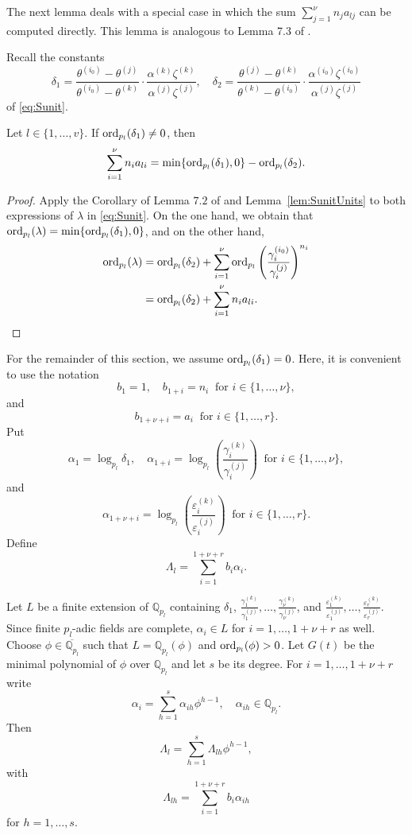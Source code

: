 The next lemma deals with a special case in which the sum $\sum_{j = 1}^{\nu} n_ja_{lj}$ can be computed directly. This lemma is analogous to Lemma 7.3 of \cite{TW3}.

Recall the constants
\[\delta_1 = \frac{\theta^{(i_0)} - \theta^{(j)}}{\theta^{(i_0)} - \theta^{(k)}}\cdot\frac{\alpha^{(k)}\zeta^{(k)}}{\alpha^{(j)}\zeta^{(j)}}, \quad \delta_2 = \frac{\theta^{(j)} - \theta^{(k)}}{\theta^{(k)} - \theta^{(i_0)}}\cdot \frac{\alpha^{(i_0)}\zeta^{(i_0)}}{\alpha^{(j)}\zeta^{(j)}}\]
of \eqref{eq:Sunit}.
\begin{lemma}\label{lem:Delta1}
Let $l \in \{1, \dots, v\}$. If $\operatorname{ord}_{p_l}(\delta_1) \neq 0$, then 
\[ \sum_{i = 1}^{\nu} n_ia_{li} = \min\{\operatorname{ord}_{p_l}(\delta_1), 0\} - \operatorname{ord}_{p_l}(\delta_2).\]
\end{lemma}

\begin{proof}
Apply the Corollary of Lemma $7.2$ of \cite{TW3} and Lemma~\ref{lem:SunitUnits} to both expressions of $\lambda$ in \eqref{eq:Sunit}. On the one hand, we obtain that $\operatorname{ord}_{p_l}(\lambda) = \min\{\operatorname{ord}_{p_l}(\delta_1), 0\}$, and on the other hand, 
\begin{align*}
\operatorname{ord}_{p_l}(\lambda)
& = \operatorname{ord}_{p_l}(\delta_2) + \sum_{i = 1}^{\nu} \operatorname{ord}_{p_l}\left( \frac{\gamma_i^{(i_0)}}{\gamma_i^{(j)}}\right)^{n_i}\\
& = \operatorname{ord}_{p_l}(\delta_2) + \sum_{i = 1}^{\nu} n_ia_{li}.
\end{align*}
\end{proof}

For the remainder of this section, we assume $\operatorname{ord}_{p_l}(\delta_1) = 0$. Here, it is convenient to use the notation
\[b_1 = 1, \quad b_{1+i} = n_i \ \text{ for } i \in \{1, \dots, \nu\},\] 
and
\[ b_{1+{\nu}+i} = a_i \ \text{ for } i  \in \{1, \dots, r\}.\]
Put
\[\alpha_1 = \log_{p_l} \delta_1, \quad \alpha_{1+i} = \log_{p_l}\left( \frac{\gamma_i^{(k)}}{\gamma_i^{(j)}}\right)  \ \text{ for } i \in \{1, \dots, \nu\},\]
and
\[\alpha_{1+\nu+i} = \log_{p_l}\left( \frac{\varepsilon_i^{(k)}}{\varepsilon_i^{(j)}}\right) \ \text{ for } i  \in \{1, \dots, r\}.\]
Define
\[\Lambda_l = \sum_{i = 1}^{1+\nu+r} b_i\alpha_i.\]

Let $L$ be a finite extension of $\mathbb{Q}_{p_l}$ containing $\delta_1$, $\frac{\gamma_1^{(k)}}{\gamma_1^{(j)}}, \dots, \frac{\gamma_{\nu}^{(k)}}{\gamma_{\nu}^{(j)}}$, and $\frac{\varepsilon_1^{(k)}}{\varepsilon_1^{(j)}}, \dots, \frac{\varepsilon_r^{(k)}}{\varepsilon_r^{(j)}}$. Since finite $p_l$-adic fields are complete, $\alpha_i \in L$ for $i = 1, \dots, 1+\nu+r$ as well. Choose $\phi \in \overline{\mathbb{Q}_{p_l}}$ such that $L = \mathbb{Q}_{p_l}(\phi)$ and $\operatorname{ord}_{p_l}(\phi) > 0 $. Let $G(t)$ be the minimal polynomial of $\phi$ over $\mathbb{Q}_{p_l}$ and let $s$ be its degree. For $i = 1, \dots, 1+\nu+r$ write
\[\alpha_i = \sum_{h = 1}^s \alpha_{ih}\phi^{h - 1}, \quad \alpha_{ih} \in \mathbb{Q}_{p_l}.\]
Then
\begin{equation} \label{eq:LambdaL}
\Lambda_l = \sum_{h = 1}^s \Lambda_{lh}\phi^{h-1},
\end{equation}
with
\[\Lambda_{lh} = \sum_{i = 1}^{1+\nu+r} b_i \alpha_{ih}\]
for $h = 1, \dots, s$. 

